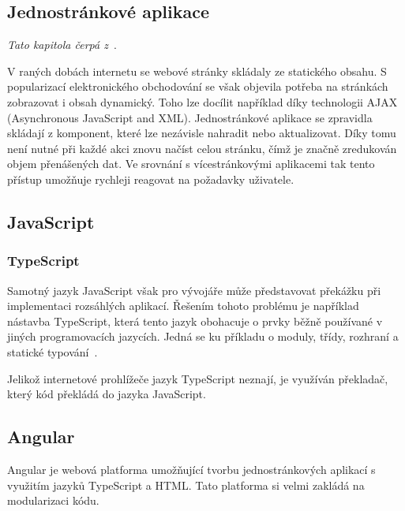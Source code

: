 \subsection{Jednostránkové aplikace}

\emph{Tato kapitola čerpá z~\cite{bib:spa}}.

V raných dobách internetu se webové stránky skládaly ze statického obsahu. S popularizací elektronického obchodování se však objevila potřeba na stránkách zobrazovat i obsah dynamický. 
Toho lze docílit například díky technologii AJAX (Asynchronous JavaScript and XML). Jednostránkové aplikace se zpravidla skládají z komponent, které lze nezávisle nahradit nebo aktualizovat. Díky tomu není nutné při každé akci znovu načíst celou stránku, čímž je značně zredukován objem přenášených dat. Ve srovnání s vícestránkovými aplikacemi tak tento přístup umožňuje rychleji reagovat na požadavky uživatele.

\blindtext %

\subsection{JavaScript}
\blindtext

\subsubsection{TypeScript}
Samotný jazyk JavaScript však pro vývojáře může představovat překážku při implementaci rozsáhlých aplikací. %
Řešením tohoto problému je například nástavba TypeScript, která tento jazyk obohacuje o prvky běžně používané v jiných programovacích jazycích. Jedná se ku příkladu o moduly, třídy, rozhraní a statické typování~\cite{bib:typescript}.
 
Jelikož internetové prohlížeče jazyk TypeScript neznají, je využíván překladač, který kód překládá do jazyka JavaScript.

\blindtext

\subsection{Angular}
Angular je webová platforma umožňující tvorbu jednostránkových aplikací s využitím jazyků TypeScript a HTML. Tato platforma si velmi zakládá na modularizaci kódu.
\blindtext[2] %


